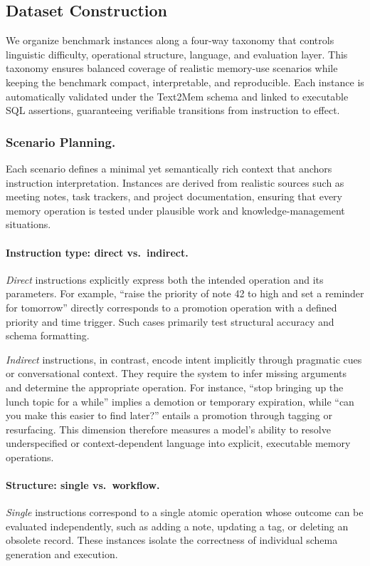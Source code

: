 \documentclass[conference]{IEEEtran}
\begin{document}
\subsection{Dataset Construction}
We organize benchmark instances along a four-way taxonomy that controls linguistic difficulty, operational structure, language, and evaluation layer.  
This taxonomy ensures balanced coverage of realistic memory-use scenarios while keeping the benchmark compact, interpretable, and reproducible.  
Each instance is automatically validated under the Text2Mem schema and linked to executable SQL assertions, guaranteeing verifiable transitions from instruction to effect.

\subsubsection{\textbf{Scenario Planning.}}
Each scenario defines a minimal yet semantically rich context that anchors instruction interpretation.  
Instances are derived from realistic sources such as meeting notes, task trackers, and project documentation, ensuring that every memory operation is tested under plausible work and knowledge-management situations.

\paragraph{Instruction type: direct vs.\ indirect.}
\emph{Direct} instructions explicitly express both the intended operation and its parameters.  
For example, “raise the priority of note 42 to high and set a reminder for tomorrow” directly corresponds to a promotion operation with a defined priority and time trigger.  
Such cases primarily test structural accuracy and schema formatting.

\emph{Indirect} instructions, in contrast, encode intent implicitly through pragmatic cues or conversational context.  
They require the system to infer missing arguments and determine the appropriate operation.  
For instance, “stop bringing up the lunch topic for a while” implies a demotion or temporary expiration, while “can you make this easier to find later?” entails a promotion through tagging or resurfacing.  
This dimension therefore measures a model’s ability to resolve underspecified or context-dependent language into explicit, executable memory operations.

\paragraph{Structure: single vs.\ workflow.}
\emph{Single} instructions correspond to a single atomic operation whose outcome can be evaluated independently, such as adding a note, updating a tag, or deleting an obsolete record.  
These instances isolate the correctness of individual schema generation and execution.
\end{document}
